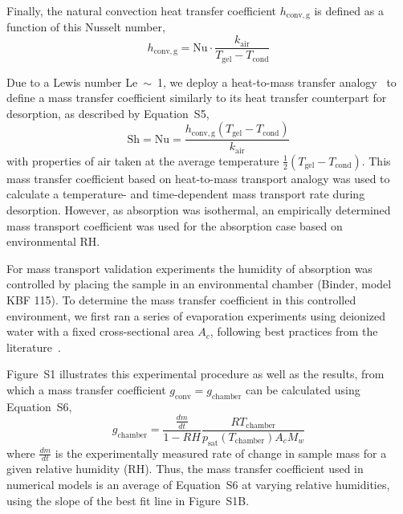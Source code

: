 \documentclass[11pt]{article}
\begin{document}
Finally, the natural convection heat transfer coefficient $h_{\mathrm{conv,g}}$ is defined as a function of this Nusselt number,
\begin{equation}
h_{\mathrm{conv,g}} = \mathrm{Nu} \cdot \frac{k_{\mathrm{air}}}{T_{\mathrm{gel}} - T_{\mathrm{cond}}}
\end{equation}

Due to a Lewis number Le~$\sim$~1, we deploy a heat-to-mass transfer analogy~\cite{sambrosini2006} to define a mass transfer coefficient similarly to its heat transfer counterpart for desorption, as described by Equation~S5,
\begin{equation}
\mathrm{Sh} = \mathrm{Nu} = \frac{h_{\mathrm{conv,g}}\left(T_{\mathrm{gel}} - T_{\mathrm{cond}}\right)}{k_{\mathrm{air}}}
\end{equation}
with properties of air taken at the average temperature $\frac{1}{2}\left(T_{\mathrm{gel}} - T_{\mathrm{cond}}\right)$. This mass transfer coefficient based on heat-to-mass transport analogy was used to calculate a temperature- and time-dependent mass transport rate during desorption. However, as absorption was isothermal, an empirically determined mass transport coefficient was used for the absorption case based on environmental RH.

For mass transport validation experiments the humidity of absorption was controlled by placing the sample in an environmental chamber (Binder, model KBF 115). To determine the mass transfer coefficient in this controlled environment, we first ran a series of evaporation experiments using deionized water with a fixed cross-sectional area $A_c$, following best practices from the literature~\cite{spoos2020}.

Figure~S1 illustrates this experimental procedure as well as the results, from which a mass transfer coefficient $g_{\mathrm{conv}} = g_{\mathrm{chamber}}$ can be calculated using Equation~S6,
\begin{equation}
g_{\mathrm{chamber}} = \frac{\frac{dm}{dt}}{1 - RH} \frac{R T_{\mathrm{chamber}}}{p_{\mathrm{sat}}(T_{\mathrm{chamber}}) A_c M_w}
\end{equation}
where $\frac{dm}{dt}$ is the experimentally measured rate of change in sample mass for a given relative humidity (RH). Thus, the mass transfer coefficient used in numerical models is an average of Equation~S6 at varying relative humidities, using the slope of the best fit line in Figure~S1B.
\end{document}
